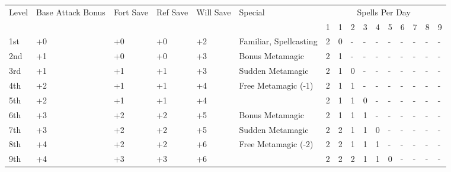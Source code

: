 
\vspace{-8pt}






 
\begin{table}[htb]
\begin{small}
\begin{tabular}{lp{1.2cm}p{0.7cm}p{0.7cm}p{0.7cm}p{4.7cm}llllllllll}
Level  &Base Attack  Bonus &Fort Save &Ref Save &Will Save &Special                 & \multicolumn{10}{c}{Spells Per Day}\\
       &                   &          &         &          &                        &1 &1 &2 &3 &4 &5 &6 &7 &8 &9 \\
1st    &+0                 &+0        &+0       &+2        & Familiar, Spellcasting &2 &0 &- &- &- &- &- &- &- &- \\
2nd    &+1                 &+0        &+0       &+3        & Bonus Metamagic        &2 &1 &- &- &- &- &- &- &- &- \\
3rd    &+1                 &+1        &+1       &+3        & Sudden Metamagic       &2 &1 &0 &- &- &- &- &- &- &- \\
4th    &+2                 &+1        &+1       &+4        & Free Metamagic (-1)    &2 &1 &1 &- &- &- &- &- &- &- \\
5th    &+2                 &+1        &+1       &+4        &                        &2 &1 &1 &0 &- &- &- &- &- &- \\
6th    &+3                 &+2        &+2       &+5        & Bonus Metamagic        &2 &1 &1 &1 &- &- &- &- &- &- \\
7th    &+3                 &+2        &+2       &+5        & Sudden Metamagic       &2 &2 &1 &1 &0 &- &- &- &- &- \\
8th    &+4                 &+2        &+2       &+6        & Free Metamagic (-2)    &2 &2 &1 &1 &1 &- &- &- &- &- \\
9th    &+4                 &+3        &+3       &+6        &                        &2 &2 &2 &1 &1 &0 &- &- &- &- \\

\end{tabular}
\end{small}
\end{table}
